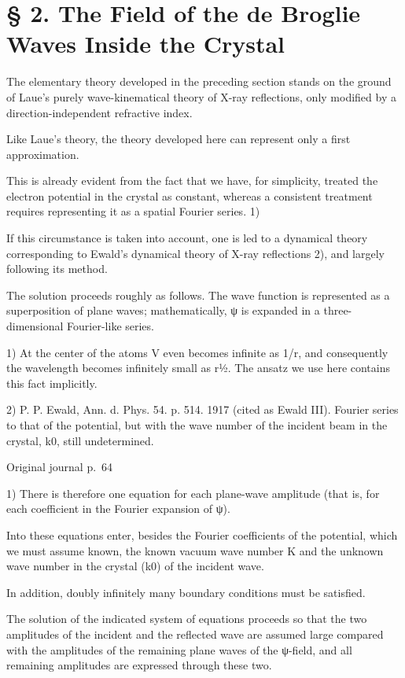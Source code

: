 \documentclass[10pt]{article}
\newcommand{\origpage}[1]{\par\medskip\noindent\hfill{\small\color{notegray}Original journal p.~#1}\hfill\mbox{}\par\smallskip}
\begin{document}
\section*{§ 2. The Field of the de Broglie Waves Inside the Crystal}
The elementary theory developed in the preceding section stands on the ground of Laue's purely wave-kinematical theory of X-ray reflections, only modified by a direction-independent refractive index.\par
Like Laue's theory, the theory developed here can represent only a first approximation.\par
This is already evident from the fact that we have, for simplicity, treated the electron potential in the crystal as constant, whereas a consistent treatment requires representing it as a spatial Fourier series. 1)\par
If this circumstance is taken into account, one is led to a dynamical theory corresponding to Ewald's dynamical theory of X-ray reflections 2), and largely following its method.\par
The solution proceeds roughly as follows. The wave function is represented as a superposition of plane waves; mathematically, ψ is expanded in a three-dimensional Fourier-like series.\par
\noindent\footnotesize 1) At the center of the atoms V even becomes infinite as 1/r, and consequently the wavelength becomes infinitely small as r1⁄2. The ansatz we use here contains this fact implicitly.\par\normalsize
\noindent\footnotesize 2) P. P. Ewald, Ann. d. Phys. 54. p. 514. 1917 (cited as Ewald III). Fourier series to that of the potential, but with the wave number of the incident beam in the crystal, k0, still undetermined.\par\normalsize
\origpage{64}
\noindent\footnotesize 1) There is therefore one equation for each plane-wave amplitude (that is, for each coefficient in the Fourier expansion of ψ).\par\normalsize
Into these equations enter, besides the Fourier coefficients of the potential, which we must assume known, the known vacuum wave number K and the unknown wave number in the crystal (k0) of the incident wave.\par
In addition, doubly infinitely many boundary conditions must be satisfied.\par
The solution of the indicated system of equations proceeds so that the two amplitudes of the incident and the reflected wave are assumed large compared with the amplitudes of the remaining plane waves of the ψ-field, and all remaining amplitudes are expressed through these two.\par
\end{document}
